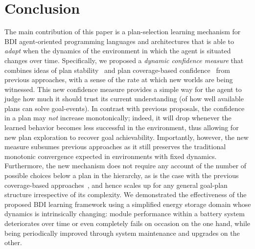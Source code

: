 \section{Conclusion}\label{sec:discussion}

The main contribution of this paper is a plan-selection learning mechanism for BDI agent-oriented programming languages and architectures that is able to \emph{adapt} when the dynamics of the environment in which the agent is situated changes over time.
Specifically, we proposed a \emph{dynamic confidence measure} that combines ideas of plan stability~\cite{airiau09:enhancing} and plan coverage-based confidence~\cite{singh10:extending,singh10:learning} from previous approaches, with a sense of the rate at which new worlds are being witnessed. This new confidence measure provides a simple way for the agent to judge how much it should trust its current understanding (of how well available plans can solve goal-events). 
In contrast with previous proposals, the confidence in a plan may \emph{not} increase monotonically; indeed, it will drop whenever the learned behavior becomes less successful in the environment, thus allowing for new plan exploration to recover goal achievability. 
%
Importantly, however, the new measure subsumes previous approaches as it still preserves the traditional monotonic convergence expected in environments with fixed dynamics.
%
Furthermore, the new mechanism does not require any account of the number of possible choices below a plan in the hierarchy, as is the case with the previous coverage-based approaches~\cite{singh10:extending,singh10:learning}, and hence scales up for any general goal-plan structure irrespective of its complexity. 
We demonstrated the effectiveness of the proposed BDI learning framework using a simplified energy storage domain whose dynamics is intrinsically changing: module performance within a battery system deteriorates over time or even completely fails on occasion on the one hand, while being periodically improved through system maintenance and upgrades on the other.  



